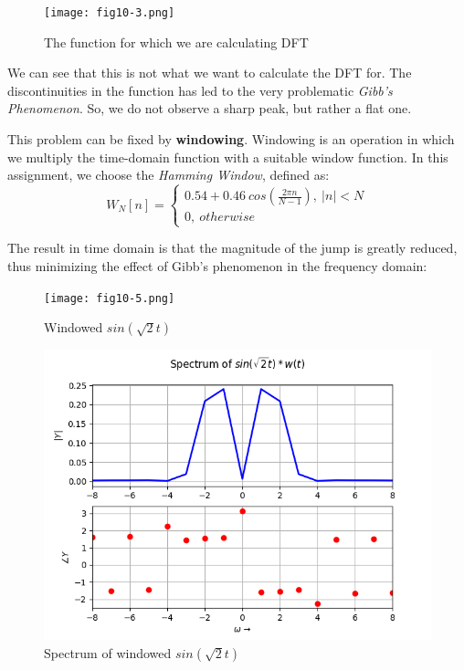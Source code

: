 \documentclass[11pt, a4paper, twoside]{article}
\begin{document}
    \begin{figure}
        \centering
        \texttt{[image: fig10-3.png]}
        \caption{The function for which we are calculating DFT}
        \label{fig:fig10-3}
    \end{figure}
    
    We can see that this is not what we want to calculate the DFT for. The discontinuities in the function has led to the very problematic \textit{Gibb's Phenomenon}. So, we do not observe a sharp peak, but rather a flat one.
    
    This problem can be fixed by \textbf{windowing}. Windowing is an operation in which we multiply the time-domain function with a suitable window function. In this assignment, we choose the \textit{Hamming Window}, defined as:
    \begin{equation*}
        W_N[n] = \begin{cases}
                0.54 + 0.46\ cos(\frac{2\pi n}{N-1}),\  |n| < N\\
                0,\ otherwise
                \end{cases}
    \end{equation*}
    
    The result in time domain is that the magnitude of the jump is greatly reduced, thus minimizing the effect of Gibb's phenomenon in the frequency domain:
    \begin{figure}
        \centering
        \texttt{[image: fig10-5.png]}
        \caption{Windowed $sin(\sqrt{2}t)$}
        \label{fig:fig10-5}
    \end{figure}
    
    \begin{figure}
        \centering
        \includegraphics[scale=0.5]{Fig1.png}
        \caption{Spectrum of windowed $sin(\sqrt{2}t)$}
        \label{fig:Fig1}
    \end{figure}
\end{document}
